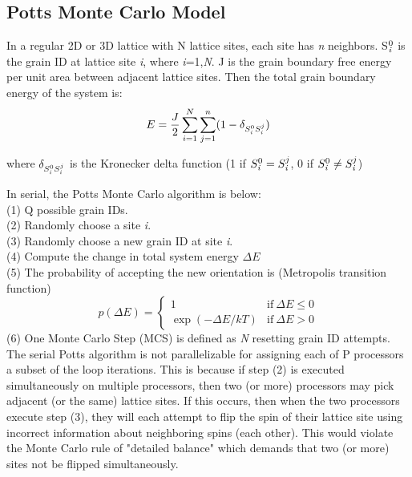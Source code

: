 \documentclass[11pt]{article}
\begin{document}
\begin{multicols*}{2}
\subsection*{Potts Monte Carlo Model}
In a regular 2D or 3D lattice with N lattice sites, each site has \emph{n} neighbors. S$^0_\emph{i}$ is the grain ID at lattice site \emph{i}, where \emph{i}=1,\emph{N}. J is the grain boundary free energy per unit area between adjacent lattice sites. Then the total grain boundary energy of the system is:
\begin{equation}
E = \frac{J}{2}\sum_{i=1}^{N} \sum_{j=1}^{n} (1 - \delta_{S^0_\emph{i} S^j_\emph{i}})
\label{eqn:pottsE}
\end{equation}

where $\delta_{S^0_\emph{i} S^j_\emph{i}}$ is the Kronecker delta function (1 if $S^0_\emph{i}=S^j_\emph{i}$, 0 if $S^0_\emph{i} \neq S^j_\emph{i}$)

In serial, the Potts Monte Carlo algorithm is below:\\
(1) Q possible grain IDs.\\
(2) Randomly choose a site \emph{i}.\\
(3) Randomly choose a new grain ID at site \emph{i}.\\
(4) Compute the change in total system energy $\Delta E$\\
(5) The probability of accepting the new orientation is (Metropolis transition function)\\
\begin{equation}
p(\Delta E) = \begin{cases} 
		1 		   & \mathrm{if}\ \Delta E \le 0 \\
		\exp(-\Delta E/kT) & \mathrm{if}\ \Delta E > 0
	      \end{cases}
\label{eqn:pottsP}
\end{equation}
(6) One Monte Carlo Step (MCS) is defined as \emph{N} resetting grain ID attempts. \\

The serial Potts algorithm is not parallelizable for assigning each of P processors a subset of the loop iterations. This is because if step (2) is executed simultaneously on multiple processors, then two (or more) processors may pick adjacent (or the same) lattice sites. If this occurs, then when the two processors execute step (3), they will each attempt to flip the spin of their lattice site using incorrect information about neighboring spins (each other). This would violate the Monte Carlo rule of "detailed balance" which demands that two (or more) sites not be flipped simultaneously.


\end{multicols*}
\end{document}
